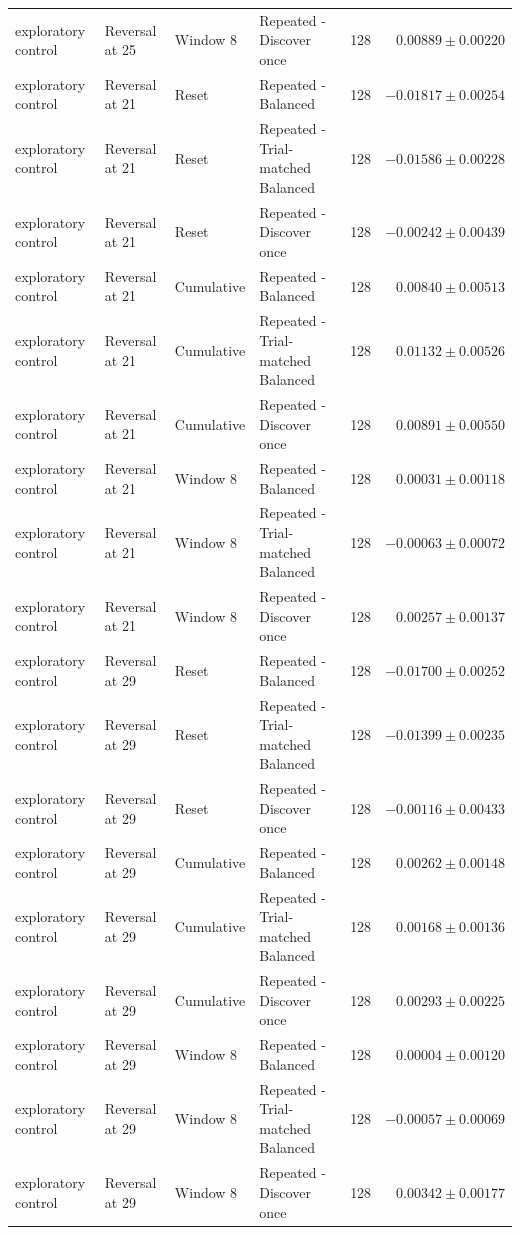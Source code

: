 \begin{longtable}{@{}lp{.19\linewidth}lp{.29\linewidth}rr@{}}
exploratory control & Reversal at 25 & Window 8 & Repeated - Discover once & 128 & $0.00889 \pm 0.00220$ \\
exploratory control & Reversal at 21 & Reset & Repeated - Balanced & 128 & $-0.01817 \pm 0.00254$ \\
exploratory control & Reversal at 21 & Reset & Repeated - Trial-matched Balanced & 128 & $-0.01586 \pm 0.00228$ \\
exploratory control & Reversal at 21 & Reset & Repeated - Discover once & 128 & $-0.00242 \pm 0.00439$ \\
exploratory control & Reversal at 21 & Cumulative & Repeated - Balanced & 128 & $0.00840 \pm 0.00513$ \\
exploratory control & Reversal at 21 & Cumulative & Repeated - Trial-matched Balanced & 128 & $0.01132 \pm 0.00526$ \\
exploratory control & Reversal at 21 & Cumulative & Repeated - Discover once & 128 & $0.00891 \pm 0.00550$ \\
exploratory control & Reversal at 21 & Window 8 & Repeated - Balanced & 128 & $0.00031 \pm 0.00118$ \\
exploratory control & Reversal at 21 & Window 8 & Repeated - Trial-matched Balanced & 128 & $-0.00063 \pm 0.00072$ \\
exploratory control & Reversal at 21 & Window 8 & Repeated - Discover once & 128 & $0.00257 \pm 0.00137$ \\
exploratory control & Reversal at 29 & Reset & Repeated - Balanced & 128 & $-0.01700 \pm 0.00252$ \\
exploratory control & Reversal at 29 & Reset & Repeated - Trial-matched Balanced & 128 & $-0.01399 \pm 0.00235$ \\
exploratory control & Reversal at 29 & Reset & Repeated - Discover once & 128 & $-0.00116 \pm 0.00433$ \\
exploratory control & Reversal at 29 & Cumulative & Repeated - Balanced & 128 & $0.00262 \pm 0.00148$ \\
exploratory control & Reversal at 29 & Cumulative & Repeated - Trial-matched Balanced & 128 & $0.00168 \pm 0.00136$ \\
exploratory control & Reversal at 29 & Cumulative & Repeated - Discover once & 128 & $0.00293 \pm 0.00225$ \\
exploratory control & Reversal at 29 & Window 8 & Repeated - Balanced & 128 & $0.00004 \pm 0.00120$ \\
exploratory control & Reversal at 29 & Window 8 & Repeated - Trial-matched Balanced & 128 & $-0.00057 \pm 0.00069$ \\
exploratory control & Reversal at 29 & Window 8 & Repeated - Discover once & 128 & $0.00342 \pm 0.00177$ \\
\end{longtable}\endgroup
\clearpage

